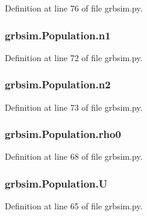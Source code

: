 Definition at line 76 of file grbsim.\-py.

\hypertarget{classgrbsim_1_1_population_a3e5dfa08846efa032f7ee66857b82b3b}{
\subsubsection[{n1}]{\setlength{\rightskip}{0pt plus 5cm}grbsim.\-Population.\-n1}}\label{classgrbsim_1_1_population_a3e5dfa08846efa032f7ee66857b82b3b}


Definition at line 72 of file grbsim.\-py.

\hypertarget{classgrbsim_1_1_population_a459454cd1bb014924b82cbbce9403cca}{
\subsubsection[{n2}]{\setlength{\rightskip}{0pt plus 5cm}grbsim.\-Population.\-n2}}\label{classgrbsim_1_1_population_a459454cd1bb014924b82cbbce9403cca}


Definition at line 73 of file grbsim.\-py.

\hypertarget{classgrbsim_1_1_population_aa7e089ed973dfa3c856e9e2dc67cae48}{
\subsubsection[{rho0}]{\setlength{\rightskip}{0pt plus 5cm}grbsim.\-Population.\-rho0}}\label{classgrbsim_1_1_population_aa7e089ed973dfa3c856e9e2dc67cae48}


Definition at line 68 of file grbsim.\-py.

\hypertarget{classgrbsim_1_1_population_a142257ab80688d2ce937e9fc8e960e96}{
\subsubsection[{U}]{\setlength{\rightskip}{0pt plus 5cm}grbsim.\-Population.\-U}}\label{classgrbsim_1_1_population_a142257ab80688d2ce937e9fc8e960e96}


Definition at line 65 of file grbsim.\-py.

